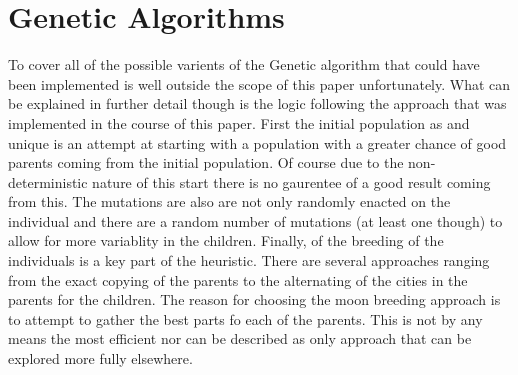 \documentclass[midd]{thesis}
\newcommand{\tab}{\hspace*{2em}}
\begin{document}
\section{Genetic Algorithms}
\tab To cover all of the possible varients of the Genetic algorithm that could have been implemented is well outside the scope of this paper unfortunately. What can be explained in further detail though is the logic following the approach that was implemented in the course of this paper. First the initial population as and unique is an attempt at starting with a population with a greater chance of good parents coming from the initial population. Of course due to the non-deterministic nature of this start there is no gaurentee of a good result coming from this. The mutations are also are not only randomly enacted on the individual and there are a random number of mutations (at least one though) to allow for more variablity in the children. Finally, of the breeding of the individuals is a key part of the heuristic. There are several approaches ranging from the exact copying of the parents to the alternating of the cities in the parents for the children. The reason for choosing the moon breeding approach is to attempt to gather the best parts fo each of the parents. This is not by any means the most efficient nor can be described as only approach that can be explored more fully elsewhere.\\
\end{document}
